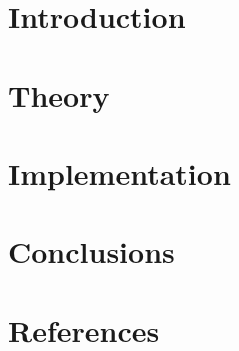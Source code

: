 \section[Intro]{Introduction}


\section[Th]{Theory}


\section[Imlp]{Implementation}


\section[Concl]{Conclusions}


\section[Ref]{References}
